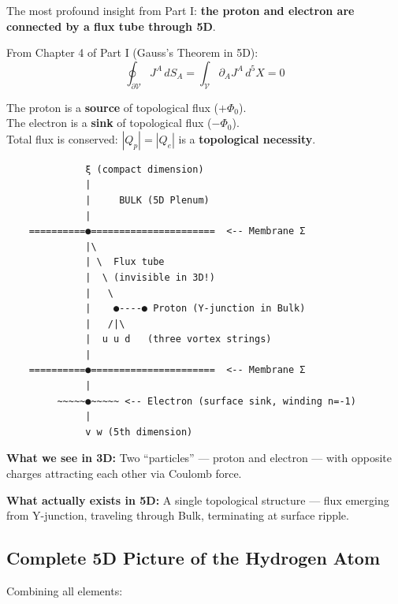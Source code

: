 The most profound insight from Part I: \textbf{the proton and electron are connected by a flux tube through 5D}.

From Chapter 4 of Part I (Gauss's Theorem in 5D):
\begin{equation}
\oint_{\partial \mathcal{V}} J^A \, dS_A = \int_{\mathcal{V}} \partial_A J^A \, d^5X = 0
\end{equation}

The proton is a \textbf{source} of topological flux ($+\Phi_0$).\\
The electron is a \textbf{sink} of topological flux ($-\Phi_0$).\\
Total flux is conserved: $|Q_p| = |Q_e|$ is a \textbf{topological necessity}.

\begin{tcolorbox}[colback=yellow!5,colframe=orange!70,title=\textbf{5D View of the Hydrogen Atom}]
\begin{verbatim}
              ξ (compact dimension)
              |
              |     BULK (5D Plenum)
              |
    ==========●======================  <-- Membrane Σ
              |\
              | \  Flux tube
              |  \ (invisible in 3D!)
              |   \
              |    ●----● Proton (Y-junction in Bulk)
              |   /|\
              |  u u d   (three vortex strings)
              |
    ==========●======================  <-- Membrane Σ
              |
         ~~~~~●~~~~~ <-- Electron (surface sink, winding n=-1)
              |
              v w (5th dimension)
\end{verbatim}
\end{tcolorbox}

\textbf{What we see in 3D:} Two ``particles'' --- proton and electron --- with opposite charges attracting each other via Coulomb force.

\textbf{What actually exists in 5D:} A single topological structure --- flux emerging from Y-junction, traveling through Bulk, terminating at surface ripple.

\subsection{Complete 5D Picture of the Hydrogen Atom}
\label{subsec:complete_picture}

Combining all elements:

